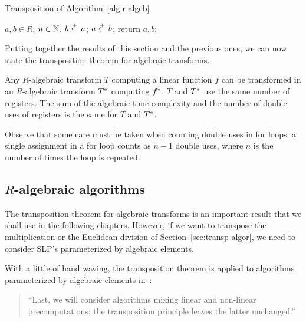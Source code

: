 \begin{algorithm}
  \caption{\label{alg:r-algeb-t}Transposition of
    Algorithm~\ref{alg:r-algeb}}
  \begin{algorithmic}
    \REQUIRE $a,b\in R$; $n\in\mathbb{N}$.
    \STATE $b \overset{+}{\leftarrow} a$;
    \ELSE
    \STATE $a \overset{+}{\leftarrow} b$;
    \ENDIF
    \ENDFOR
    \STATE return $a,b$;
  \end{algorithmic}
\end{algorithm}

Putting together the results of this section and the previous ones, we
can now state the transposition theorem for algebraic transforms.

\begin{theorem}
  \label{th:tellegen-R-algeb}
  Any $R$-algebraic transform $T$ computing a linear function
  $f$ can be transformed in an $R$-algebraic transform $T^\ast$
  computing $f^\ast$.  $T$ and $T^\ast$ use the same number of
  registers. The sum of the algebraic time complexity and the number
  of double uses of registers is the same for $T$ and $T^\ast$.
\end{theorem}

\begin{nota}
  Observe that some care must be taken when counting double uses in
  for loops: a single assignment in a for loop counts as $n-1$ double
  uses, where $n$ is the number of times the loop is repeated.
\end{nota}


\subsection{\texorpdfstring{$R$}{R}-algebraic algorithms}
\label{sec:r-algebr-algor}
The transposition theorem for algebraic transforms is an important
result that we shall use in the following chapters. However, if we
want to transpose the multiplication or the Euclidean division of
Section~\ref{sec:transp-algor}, we need to consider SLP's
parameterized by algebraic elements.

With a little of hand waving, the transposition theorem is applied to
algorithms parameterized by algebraic elements
in~\cite{bostan+lecerf+schost:tellegen}:
\begin{quote}
  ``Last, we will consider algorithms mixing linear and non-linear
  precomputations; the transposition principle leaves the latter
  unchanged.''
\end{quote}

